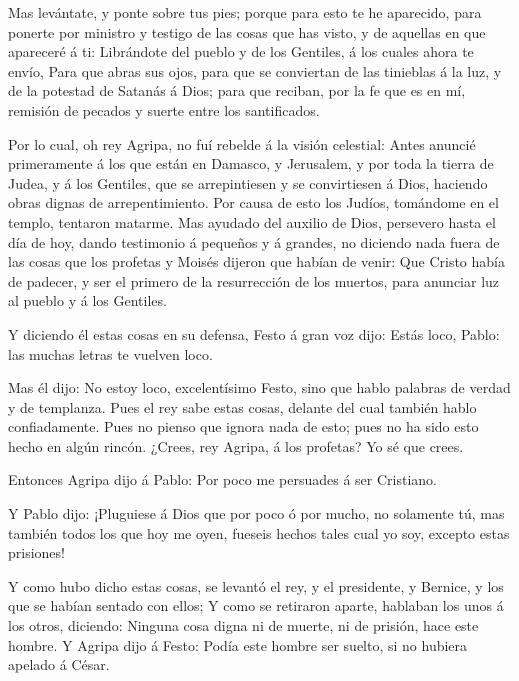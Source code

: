  Mas levántate, y ponte sobre tus pies; porque para esto te
he aparecido, para ponerte por ministro y testigo de las cosas que has
visto, y de aquellas en que apareceré á ti:  Librándote del
pueblo y de los Gentiles, á los cuales ahora te envío, 
Para que abras sus ojos, para que se conviertan de las tinieblas á la
luz, y de la potestad de Satanás á Dios; para que reciban, por la fe que
es en mí, remisión de pecados y suerte entre los santificados.

 Por lo cual, oh rey Agripa, no fuí rebelde á la visión
celestial:  Antes anuncié primeramente á los que están en
Damasco, y Jerusalem, y por toda la tierra de Judea, y á los Gentiles,
que se arrepintiesen y se convirtiesen á Dios, haciendo obras dignas de
arrepentimiento.  Por causa de esto los Judíos, tomándome
en el templo, tentaron matarme.  Mas ayudado del auxilio de
Dios, persevero hasta el día de hoy, dando testimonio á pequeños y á
grandes, no diciendo nada fuera de las cosas que los profetas y Moisés
dijeron que habían de venir:  Que Cristo había de padecer,
y ser el primero de la resurrección de los muertos, para anunciar luz al
pueblo y á los Gentiles.

 Y diciendo él estas cosas en su defensa, Festo á gran voz
dijo: Estás loco, Pablo: las muchas letras te vuelven loco.

 Mas él dijo: No estoy loco, excelentísimo Festo, sino que
hablo palabras de verdad y de templanza.  Pues el rey sabe
estas cosas, delante del cual también hablo confiadamente. Pues no
pienso que ignora nada de esto; pues no ha sido esto hecho en algún
rincón.  ¿Crees, rey Agripa, á los profetas? Yo sé que
crees.

 Entonces Agripa dijo á Pablo: Por poco me persuades á ser
Cristiano.

 Y Pablo dijo: ¡Pluguiese á Dios que por poco ó por mucho,
no solamente tú, mas también todos los que hoy me oyen, fueseis hechos
tales cual yo soy, excepto estas prisiones!

 Y como hubo dicho estas cosas, se levantó el rey, y el
presidente, y Bernice, y los que se habían sentado con ellos;
 Y como se retiraron aparte, hablaban los unos á los otros,
diciendo: Ninguna cosa digna ni de muerte, ni de prisión, hace este
hombre.  Y Agripa dijo á Festo: Podía este hombre ser
suelto, si no hubiera apelado á César.

